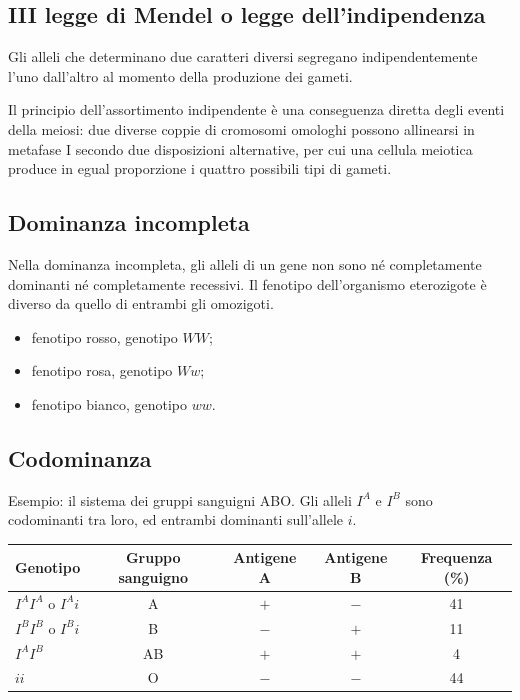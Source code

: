 \subsection{III legge di Mendel o legge dell'indipendenza}

Gli alleli che determinano due caratteri diversi segregano indipendentemente l'uno dall'altro al momento della produzione dei gameti.

Il principio dell'assortimento indipendente è una conseguenza diretta degli eventi della meiosi: due diverse coppie di cromosomi omologhi possono allinearsi in metafase I secondo due disposizioni alternative, per cui una cellula meiotica produce in egual proporzione i quattro possibili tipi di gameti.

\subsection{Dominanza incompleta}

Nella dominanza incompleta, gli alleli di un gene non sono né completamente dominanti né completamente recessivi. Il fenotipo dell'organismo eterozigote è diverso da quello di entrambi gli omozigoti.

\begin{itemize}
  \item fenotipo rosso, genotipo $WW$;
  \item fenotipo rosa, genotipo $Ww$;
  \item fenotipo bianco, genotipo $ww$.
\end{itemize}

\subsection{Codominanza}

Esempio: il sistema dei gruppi sanguigni ABO. Gli alleli $I^A$ e $I^B$ sono codominanti tra loro, ed entrambi dominanti sull'allele $i$.

\begin{table}[htbp]
  \centering
  \small
  \renewcommand{\arraystretch}{1.3}
  \begin{tabularx}{\textwidth}{|X|c|c|c|c|}
    \hline
    \textbf{Genotipo} & \textbf{Gruppo sanguigno} & \textbf{Antigene A} & \textbf{Antigene B} & \textbf{Frequenza (\%)} \\
    \hline
    $I^AI^A$ o $I^Ai$ & A & $+$ & $-$ & 41 \\
    \hline
    $I^BI^B$ o $I^Bi$ & B & $-$ & $+$ & 11 \\
    \hline
    $I^AI^B$ & AB & $+$ & $+$ & 4 \\
    \hline
    $ii$ & O & $-$ & $-$ & 44 \\
    \hline
  \end{tabularx}
\end{table}

